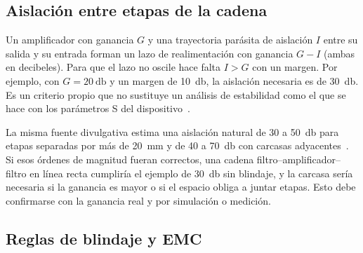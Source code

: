 \subsection{Aislación entre etapas de la cadena}\label{sec:emi-aislacion}

Un amplificador con ganancia $G$ y una trayectoria parásita de aislación $I$ entre su salida y su entrada forman un lazo de realimentación con ganancia $G - I$ (ambas en decibeles). Para que el lazo no oscile hace falta $I > G$ con un margen. Por ejemplo, con $G = \SI{20}{\decibel}$ y un margen de \SI{10}{\decibel}, la aislación necesaria es de \SI{30}{\decibel}. Es un criterio propio que no sustituye un análisis de estabilidad como el que se hace con los parámetros S del dispositivo~\cite{gonzalez}. 

La misma fuente divulgativa estima una aislación natural de \num{30} a \SI{50}{\decibel} para etapas separadas por más de \SI{20}{\milli\metre} y de \num{40} a \SI{70}{\decibel} con carcasas adyacentes~\cite{rfessentialsbls}. Si esos órdenes de magnitud fueran correctos, una cadena filtro--amplificador--filtro en línea recta cumpliría el ejemplo de \SI{30}{\decibel} sin blindaje, y la carcasa sería necesaria si la ganancia es mayor o si el espacio obliga a juntar etapas. Esto debe confirmarse con la ganancia real y por simulación o medición.

\subsection{Reglas de blindaje y EMC}\label{sec:emi-reglas}

